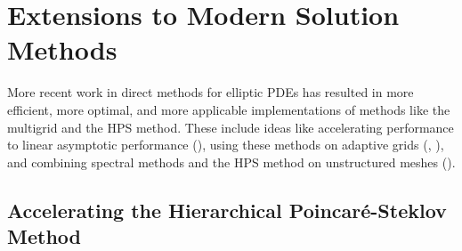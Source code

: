 \section{Extensions to Modern Solution Methods}
\label{sec:extensions}

More recent work in direct methods for elliptic PDEs has resulted in more efficient, more optimal, and more applicable implementations of methods like the multigrid and the HPS method. These include ideas like accelerating performance to linear asymptotic performance (\citep{gillman2014direct}), using these methods on adaptive grids (\citep{geldermans2019adaptive}, \citep{popinet2015quadtree}), and combining spectral methods and the HPS method on unstructured meshes (\citep{fortunato2020ultraspherical}).

\subsection{Accelerating the Hierarchical Poincaré-Steklov Method}

